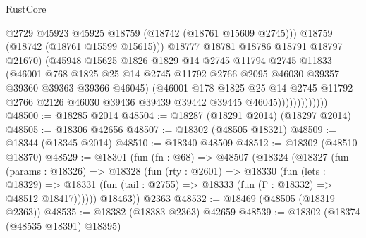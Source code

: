 \begin{lexlean}{RustCore}
\begin{coremodule}
                                @2729
                                @45923
                                @45925
                                @18759
                                (@18742 (@18761 @15609 @2745)))
                              @18759
                              (@18742 (@18761 @15599 @15615)))
                            @18777
                            @18781
                            @18786
                            @18791
                            @18797
                            @21670)
                          (@45948
                            @15625
                            @1826
                            @1829
                            @14
                            @2745
                            @11794
                            @2745
                            @11833
                            (@46001
                              @768
                              @1825
                              @25
                              @14
                              @2745
                              @11792
                              @2766
                              @2095
                              @46030
                              @39357
                              @39360
                              @39363
                              @39366
                              @46045)
                            (@46001
                              @178
                              @1825
                              @25
                              @14
                              @2745
                              @11792
                              @2766
                              @2126
                              @46030
                              @39436
                              @39439
                              @39442
                              @39445
                              @46045)))))))))))))
@48500 := @18285 @2014
@48504 := @18287 (@18291 @2014) (@18297 @2014)
@48505 := @18306 @42656
@48507 := @18302 (@48505 @18321)
@48509 := @18344 (@18345 @2014)
@48510 := @18340 @48509
@48512 := @18302 (@48510 @18370)
@48529 := @18301
    (fun (fn : @68) =>
    @48507
      (@18324
        (@18327
          (fun (params : @18326) =>
          @18328
            (fun (rty : @2601) =>
            @18330
              (fun (lets : @18329) =>
              @18331 (fun (tail : @2755) => @18333 (fun (Γ : @18332) => @48512 @18417))))))
        @18463))
    @2363
@48532 := @18469 (@48505 (@18319 @2363))
@48535 := @18382 (@18383 @2363) @42659
@48539 := @18302 (@18374 (@48535 @18391) @18395)

\end{coremodule}
\end{lexlean}
